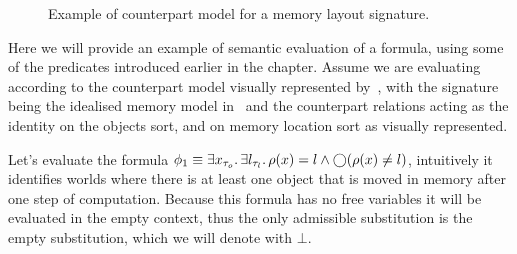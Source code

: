 \begin{figure}
  \begin{center}
  \end{center}
  \caption{Example of counterpart model for a memory layout signature.}
  \label{fig:exmemsignature}
\end{figure}

Here we will provide an example of semantic evaluation of a formula, using some of the predicates introduced earlier in the chapter.  Assume we are evaluating according to the counterpart model visually represented by~, with the signature being the idealised memory model in~ and the counterpart relations acting as the identity on the objects sort, and on memory location sort as visually represented. 

Let's evaluate the formula $\phi_1 \equiv \exists {x_{\tau_o}} \ldotp {\exists {l_{\tau_l}} \ldotp {\rho(x) = l \land \bigcirc{(\rho(x) \neq l)}}}$, intuitively it identifies worlds where there is at least one object that is moved in memory after one step of computation.
Because this formula has no free variables it will be evaluated in the empty context, thus the only admissible substitution is the empty substitution, which we will denote with $\bot$.


